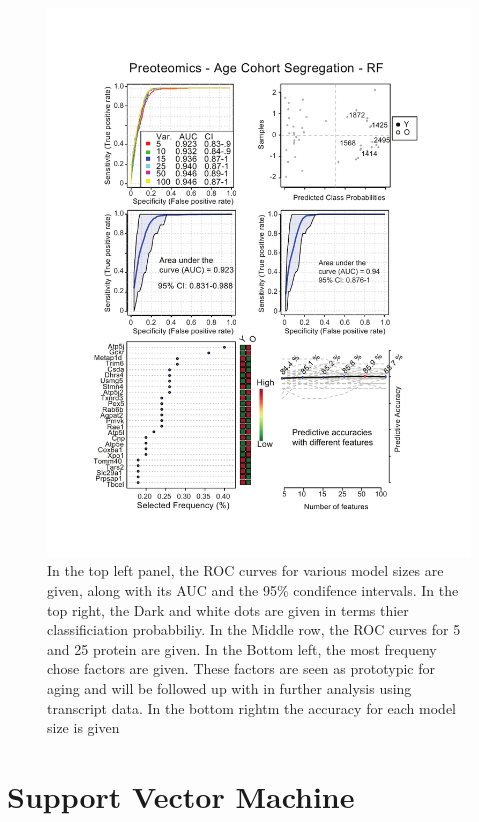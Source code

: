 \documentclass[a4paper,11pt,twoside]{book}
\begin{document}
	\begin{figure}[htb!]
		\centering
		\includegraphics[width=1.1\linewidth]{3.Proteomics/Proteomics_Vingette_Random_Forest_Age}
		\caption[Random Forest Classifier for Young and Old Mice]{In the top left panel, the ROC curves for various model sizes are given, along with its AUC and the 95\% condifence intervals. In the top right, the Dark and white dots are given in terms thier classificiation probabbiliy. In the Middle row, the ROC curves for 5 and 25 protein are given. In the Bottom left, the most frequeny chose factors are given. These factors are seen as prototypic for aging and will be followed up with in further analysis using transcript data. In the bottom rightm the accuracy for each model size is given}
		\label{fig:proteomicsvingetterandomforestage}
	\end{figure}
	
	\clearpage
	\section{Support Vector Machine}
	
\end{document}
